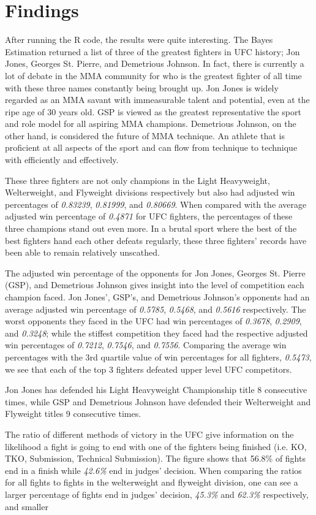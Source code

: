\documentclass[12pt,english]{report}
\begin{document}
\section{Findings}
\par After running the R code, the results were quite interesting. The Bayes Estimation returned a list of three of the greatest fighters in UFC history; Jon Jones, Georges St. Pierre, and Demetrious Johnson. In fact, there is currently a lot of debate in the MMA community for who is the greatest fighter of all time with these three names constantly being brought up. Jon Jones is widely regarded as an MMA savant with immeasurable talent and potential, even at the ripe age of 30 years old. GSP is viewed as the greatest representative the sport and role model for all aspiring MMA champions. Demetrious Johnson, on the other hand, is considered the future of MMA technique. An athlete that is proficient at all aspects of the sport and can flow from technique to technique with efficiently and effectively. \cite{ryder_2018} \par These three fighters are not only champions in the Light Heavyweight, Welterweight, and Flyweight divisions respectively but also had adjusted win percentages of \textit{0.83239}, \textit{0.81999}, and \textit{0.80669}. When compared with the average adjusted win percentage of \textit{0.4871} for UFC fighters, the percentages of these three champions stand out even more. In a brutal sport where the best of the best fighters hand each other defeats regularly, these three fighters' records have been able to remain relatively unscathed. \par The adjusted win percentage of the opponents for Jon Jones, Georges St. Pierre (GSP), and Demetrious Johnson gives insight into the level of competition each champion faced. Jon Jones', GSP's, and Demetrious Johnson's opponents had an average adjusted win percentage of \textit{0.5785}, \textit{0.5468}, and \textit{0.5616} respectively. The worst opponents they faced in the UFC had win percentages of \textit{0.3678}, \textit{0.2909}, and \textit{0.3248}; while the stiffest competition they faced had the respective adjusted win percentages of \textit{0.7212}, \textit{0.7546}, and \textit{0.7556}. Comparing the average win percentages with the 3rd quartile value of win percentages for all fighters, \textit{0.5473}, we see that each of the top 3 fighters defeated upper level UFC competitors. \par Jon Jones has defended his Light Heavyweight Championship title 8 consecutive times, while GSP and Demetrious Johnson have defended their Welterweight and Flyweight titles 9 consecutive times. \par The ratio of different methods of victory in the UFC give information on the likelihood a fight is going to end with one of the fighters being finished (i.e. KO, TKO, Submission, Technical Submission). The figure shows that 56.8\% of fights end in a finish while \textit{42.6\%} end in judges' decision. When comparing the ratios for all fights to fights in the welterweight and flyweight division, one can see a larger percentage of fights end in judges' decision, \textit{45.3\%} and \textit{62.3\%} respectively, and smaller 
\end{document}
